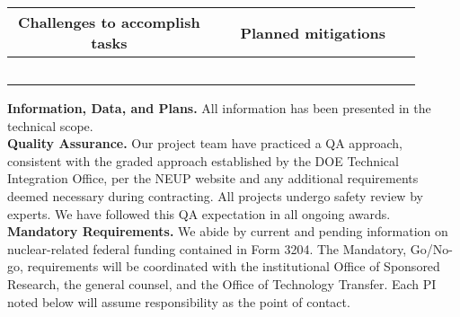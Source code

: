 \documentclass[11pt,letterpaper]{article}
\begin{document}
\begin{table}[H]
    \centering
    \begin{tabular}{|p{0.45\linewidth}|p{0.45\linewidth}|}
        \hline
        \multicolumn{1}{|c|}{\textbf{Challenges to accomplish tasks}}
        &\multicolumn{1}{|c|}{\textbf{Planned mitigations}}\\
        \hline
        
        & \\
        \hline
        
        & \\
        \hline
        
        & \\
        \hline
        
        & \\
        \hline
        
        & \\
        \hline
    \end{tabular}
    \label{tab-milestones}
\end{table}

\vspace{\baselineskip}

\noindent\textbf{Information, Data, and Plans.} All information has been presented in the technical scope.\\

\noindent\textbf{Quality Assurance.} Our project team have practiced a QA approach, consistent with the graded approach established by the DOE Technical Integration Office, per the NEUP website and any additional requirements deemed necessary during contracting. All projects undergo safety review by experts. We have followed this QA expectation in all ongoing awards.\\

\noindent\textbf{Mandatory Requirements.} We abide by current and pending information on nuclear-related federal funding contained in Form 3204. The Mandatory, Go/No-go, requirements will be coordinated with the institutional Office of Sponsored Research, the general counsel, and the Office of Technology Transfer. Each PI noted below will assume responsibility as the point of contact.\\
\end{document}
